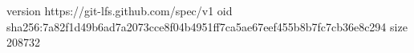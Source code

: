 version https://git-lfs.github.com/spec/v1
oid sha256:7a82f1d49b6ad7a2073cce8f04b4951ff7ca5ae67eef455b8b7fc7cb36e8c294
size 208732
